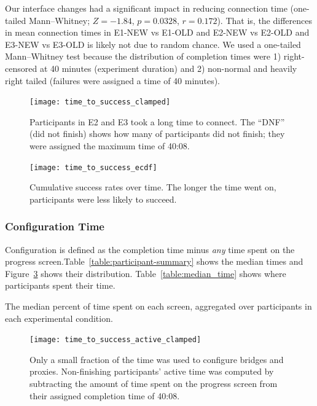 \documentclass[USenglish,oneside,twocolumn]{article}
\begin{document}
Our interface changes had a significant impact in reducing connection time (one-tailed Mann--Whitney; $ Z = -1.84$, $p = 0.0328$, $r= 0.172$). That is, the differences in mean connection times in E1-NEW vs E1-OLD and E2-NEW vs E2-OLD and E3-NEW vs E3-OLD is likely not due to random chance. We used a one-tailed Mann--Whitney test because the distribution of completion times were 1) right-censored at 40 minutes (experiment duration) and 2) non-normal and heavily right tailed (failures were assigned a time of 40 minutes). 

\begin{figure}[t]
\centering
\texttt{[image: time\_to\_success\_clamped]}
\caption{
Participants in E2 and E3 took a long time to connect.
The ``DNF'' (did not finish) shows how many of participants 
did not finish; they were assigned the maximum time of 40:08.}
\label{fig:time_to_success_clamped}
\end{figure}

\begin{figure}[t]
\centering
\texttt{[image: time\_to\_success\_ecdf]}
%
\caption{
Cumulative success rates over time. The longer the time went on, participants were less likely to succeed. 
}
\label{fig:time_to_success_ecdf}
\end{figure}


\subsubsection{Configuration Time} 
Configuration is defined as the completion time minus {\it any} time spent on the progress screen.Table~\ref{table:participant-summary} shows the median times and Figure~\ref{fig:time_to_success_active_clamped} shows their distribution. Table~\ref{table:median_time} shows where participants spent their time.  

\begin{table}[t]
\centering

\caption{
The median percent of time spent on each screen, aggregated over participants in each experimental condition. }
\label{table:median_time}
\end{table}

\begin{figure}[t]
\centering
\texttt{[image: time\_to\_success\_active\_clamped]}
\caption{
Only a small fraction of the time was used to configure bridges and proxies.
Non-finishing participants' active time was computed by
subtracting the amount of time spent on the progress screen from
their assigned completion time of 40:08.
}
\label{fig:time_to_success_active_clamped}
\end{figure}
\end{document}
